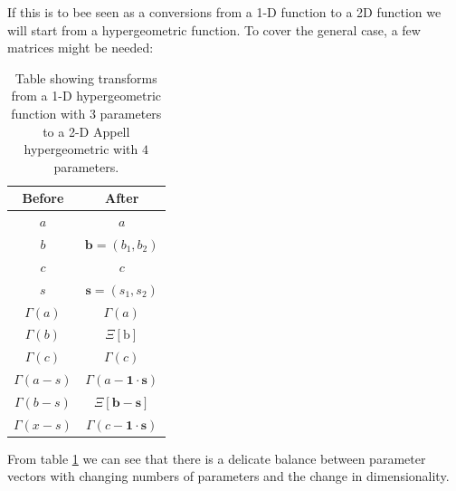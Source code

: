 \documentclass{article}
\begin{document}
If this is to bee seen as a conversions from a 1-D function to a 2D function we will start from a hypergeometric function. To cover the general case, a few matrices might be needed:
\begin{table}
\begin{tabular}{|c|c|}
\hline
Before & After \\
\hline
$a$ & $a$ \\
$b$ & $\mathbf{b}=(b_1,b_2)$ \\
$c$ & $c$ \\
$s$ & $\mathbf{s} = (s_1,s_2)$ \\
\hline
$\Gamma(a)$ & $\Gamma(a)$\\
$\Gamma(b)$ & $\Xi[\mathrm{b}]$ \\
$\Gamma(c)$ & $\Gamma(c)$\\
\hline
$\Gamma(a-s)$ & $\Gamma(a - \mathbf{1}\cdot\mathbf{s})$\\
$\Gamma(b-s)$ & $\Xi[\mathbf{b-s}]$ \\
$\Gamma(x-s)$ & $\Gamma(c - \mathbf{1}\cdot\mathbf{s})$\\
\hline
\end{tabular}
\caption{Table showing transforms from a 1-D hypergeometric function with $3$ parameters to a 2-D Appell hypergeometric with $4$ parameters. }
\label{tab:1dto2d}
\end{table}

From table \ref{tab:1dto2d} we can see that there is a delicate balance between parameter vectors with changing numbers of parameters and the change in dimensionality.
\end{document}
